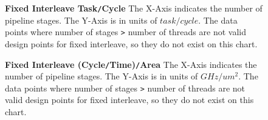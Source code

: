 \begin{figure}
\centering
{}
\caption{{\bf Fixed Interleave Task{\tt /}Cycle} The X-Axis indicates the number of pipeline stages. The Y-Axis is in units of $task/cycle$. The data points where number of stages {\tt >} number of threads are not valid design points for fixed interleave, so they do not exist on this chart.}
\label{fig:fixedTaskPerCycle}

\centering
{}
\caption{{\bf Fixed Interleave (Cycle{\tt /}Time){\tt /}Area} The X-Axis indicates the number of pipeline stages. The Y-Axis is in units of $GHz/um^2$. The data points where number of stages {\tt >} number of threads are not valid design points for fixed interleave, so they do not exist on this chart.}
\label{fig:fixedFreqPerArea}


\end{figure}
